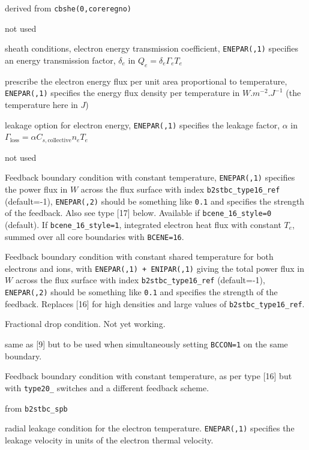 \documentclass[a4paper,10pt]{report}
\begin{document}
\begin{description}
\begin{description}
  derived from {\tt cbshe(0,coreregno)}
  \item[11] not used
  \item[12] sheath conditions, electron energy transmission coefficient,
  {\tt ENEPAR(,1)} specifies an energy transmission factor,
  $\delta_e$ in $Q_e = \delta_e \Gamma_e T_e$
  \item[13] prescribe the electron energy flux per unit area
  proportional to temperature, {\tt ENEPAR(,1)} specifies the energy
  flux density per temperature in $W.m^{-2}.J^{-1}$ (the temperature
  here in $J$)
  \item[14] leakage option for electron energy, {\tt ENEPAR(,1)} specifies
  the leakage factor, $\alpha$ in $\Gamma_{\mbox{loss}} = \alpha C_{s, \mbox{collective}} n_e T_e$
  \item[15] not used
  \item[16] Feedback boundary condition with constant temperature,
    {\tt ENEPAR(,1)} specifies the power flux in $W$ across the flux surface
    with index {\tt b2stbc\_type16\_ref} (default=-1), {\tt ENEPAR(,2)}
    should be something like {\tt 0.1} and specifies the strength of the
    feedback. Also see type [17] below. Available if {\tt bcene\_16\_style=0} (default).
    If {\tt bcene\_16\_style=1}, integrated electron heat flux with constant $T_e$, summed over all core boundaries with {\tt BCENE=16}.
  \item[17] Feedback boundary condition with constant shared temperature
    for both electrons and ions, with {\tt ENEPAR(,1) + ENIPAR(,1)} giving
    the total power flux in $W$ across the flux surface
    with index {\tt b2stbc\_type16\_ref} (default=-1), {\tt ENEPAR(,2)}
    should be something like {\tt 0.1} and specifies the strength of the
    feedback. Replaces [16] for high densities and large values of
    {\tt b2stbc\_type16\_ref}.
  \item[18] Fractional drop condition. Not yet working.
  \item[19] same as [9] but to be used when simultaneously setting {\tt BCCON=1} on the same boundary.
  \item[20] Feedback boundary condition with constant temperature,
  as per type [16] but with {\tt type20\_} switches and a different
  feedback scheme.
  \item[21] from {\tt b2stbc\_spb}
  \item[22] radial leakage condition for the electron temperature.
  {\tt ENEPAR(,1)} specifies the leakage velocity in units of the electron thermal velocity.
  \end{description}

\end{description}
\end{document}
